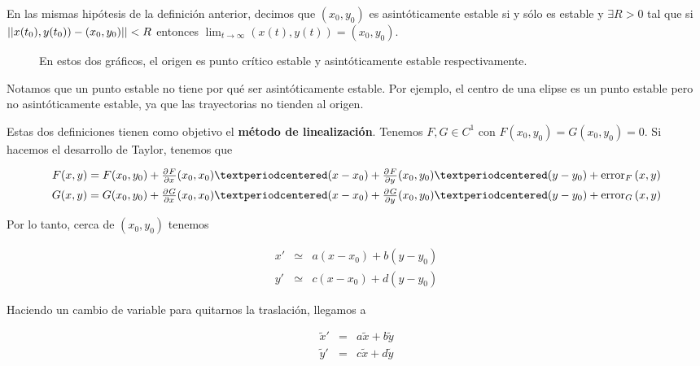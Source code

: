 \begin{definition}

En las mismas hipótesis de la definición anterior, decimos que $(x_0,y_0)$ es asintóticamente estable si y sólo es estable y $∃R>0$ tal que si $||x(t_0), y(t_0)) - (x_0,y_0)|| < R$ entonces $\lim_{t\to ∞} (x(t), y(t)) = (x_0, y_0)$.
\end{definition}

\begin{figure}[hbtp]
\caption{En estos dos gráficos, el origen es punto crítico estable y asintóticamente estable respectivamente.}
\end{figure}

Notamos que un punto estable no tiene por qué ser asintóticamente estable. Por ejemplo, el centro de una elipse es un punto estable pero no asintóticamente estable, ya que las trayectorias no tienden al origen.

Estas dos definiciones tienen como objetivo el \textbf{método de linealización}. Tenemos $F,G∈C^1$ con $F(x_0,y_0) = G(x_0, y_0) = 0$. Si hacemos el desarrollo de Taylor, tenemos que

\begin{gather*}
F(x,y) = F(x_0, y_0) + \pd{F}{x}(x_0,x_0) · (x-x_0) + \pd{F}{y}(x_0, y_0) · (y-y_0) + \mathrm{error}_F \,(x,y) \\
G(x,y) = G(x_0, y_0) + \pd{G}{x}(x_0,x_0) · (x-x_0) + \pd{G}{y}(x_0, y_0) · (y-y_0)+ \mathrm{error}_G \,(x,y)
\end{gather*}

Por lo tanto, cerca de $(x_0, y_0)$ tenemos

\begin{equation} \label{eqML_TaylorNoErr}
\begin{matrix}
x' &\simeq&  a(x-x_0) + b(y-y_0) \\
y' &\simeq& c(x-x_0) + d(y-y_0)
\end{matrix}
\end{equation}

Haciendo un cambio de variable para quitarnos la traslación, llegamos a

\begin{equation} \label{eqML_Trasl}
\begin{matrix}
\tilde{x}' &=& a\tilde{x} + b \tilde{y} \\
\tilde{y}' &=& c\tilde{x} + d \tilde{y}
\end{matrix}
\end{equation}



